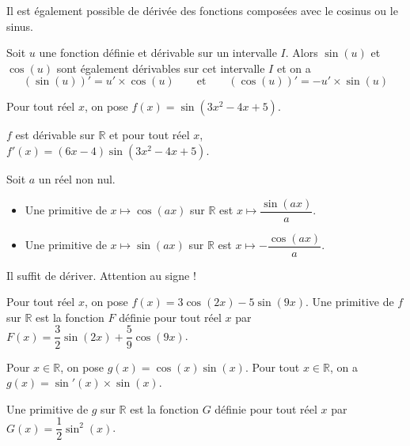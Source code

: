 \documentclass[11pt,fleqn, openany]{book} %
\begin{document}
Il est également possible de dérivée des fonctions composées avec le cosinus ou le sinus.
\begin{proposition}Soit $u$ une fonction définie et dérivable sur un intervalle $I$. Alors $\sin (u)$ et $\cos(u)$ sont également dérivables sur cet intervalle $I$ et on a
\[(\sin(u))'=u'\times \cos(u) \qquad \text{et}\qquad (\cos(u))'=-u'\times \sin(u)\]
\vspace{-0.5cm}\end{proposition}



\begin{example}Pour tout réel $x$, on pose $f(x)=\sin(3x^2-4x+5)$. 

$f$ est dérivable sur $\mathbb{R}$ et pour tout réel $x$, $f'(x)=(6x-4)\sin(3x^2-4x+5)$.\end{example}

\begin{proposition}Soit $a$ un réel non nul.
\begin{itemize}
\item Une primitive de $x\mapsto \cos(ax)$ sur $\mathbb{R}$ est $x\mapsto \dfrac{\sin(ax)}{a}$.
\item Une primitive de $x\mapsto \sin(ax)$ sur $\mathbb{R}$ est $x\mapsto -\dfrac{\cos(ax)}{a}$.
\end{itemize}\end{proposition}

\begin{demonstration}Il suffit de dériver. Attention au signe !\end{demonstration}

\begin{example}Pour tout réel $x$, on pose $f(x)=3\cos(2x)-5\sin(9x)$.
Une primitive de $f$ sur $\mathbb{R}$ est la fonction $F$ définie pour tout réel $x$ par $F(x)=\dfrac{3}{2}\sin(2x)+\dfrac{5}{9}\cos(9x)$.\end{example}

\begin{example}Pour $x\in\mathbb{R}$, on pose $g(x)=\cos(x)\sin(x)$. Pour tout $x\in\mathbb{R}$, on a $g(x)=\sin'(x) \times \sin (x)$. 

Une primitive de $g$ sur $\mathbb{R}$ est la fonction $G$ définie pour tout réel $x$ par $G(x)=\dfrac{1}{2}\sin^2(x)$.\end{example}
\end{document}
